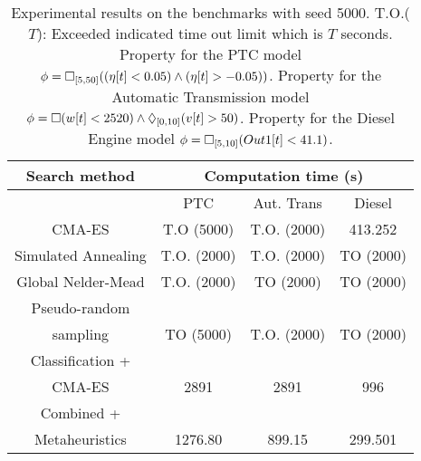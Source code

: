 \begin{table}[ht]
\label{tab:results}
\begin{center}
\begin{tabular}{|c|c|c|c|}
\hline
\multirow{1}{*}{Search method} & \multicolumn{3}{|c|}{Computation time (s)} \\
\hline
\cline{2-4}
 &  PTC & Aut. Trans & Diesel    \\
\hline
\cline{2-4}
 CMA-ES & T.O (5000)  & T.O. (2000)  &  413.252  \\
\hline
\cline{2-4}
 Simulated Annealing &  T.O. (2000) & T.O. (2000)  & TO (2000)     \\
\hline
\cline{2-4}
Global Nelder-Mead &  T.O. (2000) &  TO (2000)  &  TO (2000)    \\
\hline
\cline{2-4}
Pseudo-random & & & \\ 
sampling &  TO (5000)  &  T.O. (2000) & TO (2000)    \\
\hline
\cline{2-4}
Classification + & & & \\ 
CMA-ES  \cite{CAV2017} & 2891  & 2891  & 996    \\
\hline
\cline{2-4}
 Combined + & & & \\ 
 Metaheuristics & 1276.80 &  899.15 & 299.501   \\
\hline
\end{tabular}
\end{center}
\caption{Experimental results on the benchmarks with seed 5000. T.O.($T$): Exceeded indicated time out limit which is $T$ seconds.
Property for the PTC model $\phi = \Box_{[5,50]}( (\eta[t] < 0.05) \land ( \eta[t] > - 0.05 ))$. Property for the Automatic Transmission model $\phi =  \Box(w[t] < 2520) \land  \Diamond_{[0,10]}(v[t] > 50)$. Property for the Diesel Engine model   $\phi = \Box_{[5,10]} (Out1[t] < 41.1)$. 
}
\end{table}


